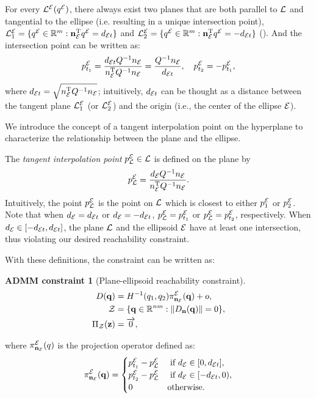 \documentclass[journal]{IEEEtran}  %
\newtheorem{constraint}{ADMM constraint}
\def\sZ{\mathcal{Z}}
\begin{document}
For every ${\mathcal{L}^{\mathcal{E}}}({q^{\mathcal{E}}})$, there always exist two planes that are both parallel to $\mathcal{L}$ and tangential to the ellipse (i.e. resulting in a unique intersection point), $\mathcal{L}_1^{\mathcal{E}} = \{{q^{\mathcal{E}}}\in\mathbb{R}^m: \mathbf{n}_{\mathcal{E}} ^\mathrm{T} {q^{\mathcal{E}}} =  d_{\mathcal{E} t} \}$ and $\mathcal{L}_2^{\mathcal{E}} = \{{q^{\mathcal{E}}}\in\mathbb{R}^m: \mathbf{n}_{\mathcal{E}} ^\mathrm{T} {q^{\mathcal{E}}} = - d_{\mathcal{E} t} \}$  (). And the intersection point can be written as:
\begin{equation}
    p^{\mathcal{E}}_{t_{1}} = \frac{ d_{\mathcal{E} t} Q^{-1}   n_{\mathcal{E}}}{ n_{\mathcal{E}} ^\mathrm{T} Q^{-1}  n_{\mathcal{E}}} = \frac{Q^{-1} n_{\mathcal{E}}}{ d_{\mathcal{E} t}},\quad  p^{\mathcal{E}}_{t_{2}} = -  p^{\mathcal{E}}_{t_{1}},
\end{equation}
where $d_{\mathcal{E} t} = \sqrt{ n_{\mathcal{E}}^\mathrm{T} Q^{-1} n_{\mathcal{E}}}$; intuitively, $d_{\mathcal{E} t}$ can be thought as a distance between the tangent plane $\mathcal{L}_1^{\mathcal{E}}$ (or $\mathcal{L}_2^{\mathcal{E}}$) and the origin (i.e., the center of the ellipse $\mathcal{E}$).

We introduce the concept of a tangent interpolation point on the hyperplane to characterize the relationship between the plane and the ellipse.

\begin{definition}
The \emph{tangent interpolation point} $p^{\mathcal{E}}_{\mathcal{L}} \in \mathcal{L}$ is defined on the plane by 
    \begin{equation}\label{equ:ProjectPoint}
      p^{\mathcal{E}}_{\mathcal{L}} = \frac{ d_{\mathcal{E}} Q^{-1} n_{\mathcal{E}}}{ n_{\mathcal{E}}^\mathrm{T} Q^{-1} n_{\mathcal{E}}}.
    \end{equation}
  Intuitively, the point $p^{\mathcal{E}}_{\mathcal{L}}$ is the point on $\mathcal{L}$ which is closest to either $p^{\mathcal{E}}_1$ or $p^{\mathcal{E}}_2$.
  Note that when  $d_{\mathcal{E}}=d_{\mathcal{E} t}$ or $d_{\mathcal{E}}=-d_{\mathcal{E} t}$, $p^{\mathcal{E}}_{\mathcal{L}}=p^{\mathcal{E}}_{t_1}$ or $p^{\mathcal{E}}_{\mathcal{L}}=p^{\mathcal{E}}_{t_2}$, respectively. When $ d_{\mathcal{E}} \in [- d_{\mathcal{E} t},  d_{\mathcal{E} t}]$, the plane $\mathcal{L}$ and the ellipsoid $\mathcal{E}$ have at least one intersection, thus violating our desired reachability constraint. 
\end{definition}

With these definitions, the constraint can be written as:

\begin{constraint}[Plane-ellipsoid reachability constraint]
\begin{align}
D(\vq) &= H^{-1}(q_{1},q_2)\pi^\cE_{\vn_\cE}(\vq)+o, \label{eq:plane_ellipsoid_constraint}\\
  \sZ &= \{\vq\in\mathbb{R}^{nm}:\norm{D_{\vn}(\vq)} = 0 \},\\
   \Pi_\sZ(\vz) & = \overrightarrow{0}, 
\end{align}
\end{constraint}
where $\pi^{\mathcal{E}}_{\mathbf{n}_{\mathcal{E}}}(q)$ is the projection operator defined as:
  \begin{equation}\label{equ:plane2ellipse}
    \pi^{\mathcal{E}}_{\mathbf{n}_{\mathcal{E}}}(\mathbf{q}) =\begin{cases}
      p^{\mathcal{E}}_{t_1}-p^{\mathcal{E}}_{\mathcal{L}} & \textrm{ if } d_{\mathcal{E}} \in [0, d_{\mathcal{E} t}], \\
      p^{\mathcal{E}}_{t_2}-p^{\mathcal{E}}_{\mathcal{L}} &  \textrm{ if } d_{\mathcal{E}} \in [- d_{\mathcal{E} t},0), \\
      {0} & \textrm{otherwise}.
    \end{cases}
  \end{equation}
\end{document}
